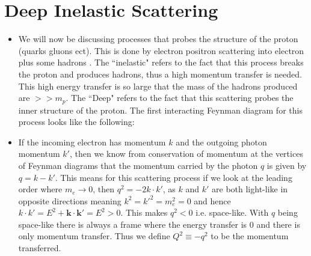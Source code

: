 \documentclass[11pt]{article}
\numberwithin{equation}{section}
\begin{document}
\section{Deep Inelastic Scattering} %
\label{sec:deep_inelastic_scattering}
\begin{itemize}
    \item We will now be discussing processes that probes the structure of the proton (quarks gluons ect). This is done by electron positron scattering into electron plus some hadrons . The ``inelastic" refers to the fact that this process breaks the proton and produces hadrons, thus a high momentum transfer is needed. This high energy transfer is so large that the mass of the hadrons produced are $>>m_p$. The ``Deep" refers to the fact that this scattering probes the inner structure of the proton. The first interacting Feynman diagram for this process looks like the following:

\begin{figure}[H]
\centering
{}
\end{figure}

\item If the incoming electron has momentum $k$ and the outgoing photon momentum $k'$, then we know from conservation of momentum at the vertices of Feynman diagrams that the momentum carried by the photon $q$ is given by $q = k-k'$. This means for this scattering process if we look at the leading order where $m_e \rightarrow 0$, then $q^2 = -2k \cdot k'$, as $k$ and $k'$ are both light-like in opposite directions meaning $k^2=k'^2=m_e^2=0$ and hence $k \cdot k' = E^2+\textbf{k}\cdot\textbf{k}' = E^2 >0$. This makes $q^2<0$ i.e. space-like. With $q$ being space-like there is always a frame where the energy transfer is $0$ and there is only momentum transfer. Thus we define $Q^2 \equiv -q^2$ to be the momentum transferred.
\end{itemize}
\end{document}
